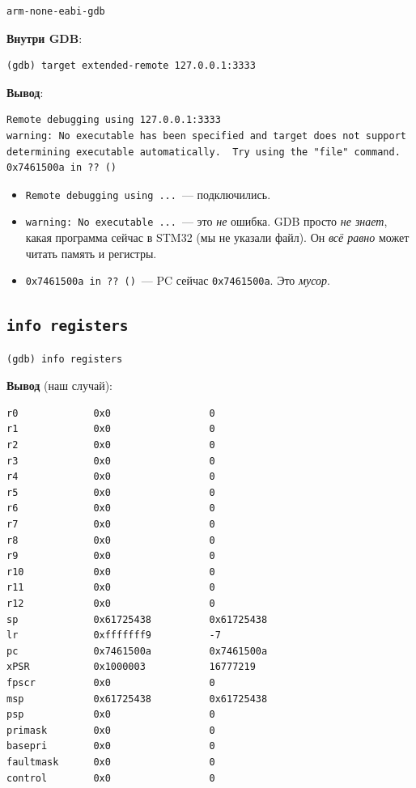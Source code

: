 \begin{verbatim}
arm-none-eabi-gdb
\end{verbatim}

\textbf{Внутри GDB}:

\begin{verbatim}
(gdb) target extended-remote 127.0.0.1:3333
\end{verbatim}

\textbf{Вывод}:

\begin{verbatim}
Remote debugging using 127.0.0.1:3333
warning: No executable has been specified and target does not support
determining executable automatically.  Try using the "file" command.
0x7461500a in ?? ()
\end{verbatim}

\begin{itemize}
    \item \texttt{Remote debugging using ...}~--- подключились.
    \item \texttt{warning: No executable ...}~--- это
          \emph{не} ошибка. GDB просто \emph{не знает},
          какая программа сейчас в STM32 (мы не указали
          файл). Он \emph{всё равно} может читать память
          и регистры.
    \item \texttt{0x7461500a in ?? ()}~--- PC сейчас
          \texttt{0x7461500a}. Это \emph{мусор}.
\end{itemize}

\subsection{\texttt{info registers}}

\begin{verbatim}
(gdb) info registers
\end{verbatim}

\textbf{Вывод} (наш случай):

\begin{verbatim}
r0             0x0                 0
r1             0x0                 0
r2             0x0                 0
r3             0x0                 0
r4             0x0                 0
r5             0x0                 0
r6             0x0                 0
r7             0x0                 0
r8             0x0                 0
r9             0x0                 0
r10            0x0                 0
r11            0x0                 0
r12            0x0                 0
sp             0x61725438          0x61725438
lr             0xfffffff9          -7
pc             0x7461500a          0x7461500a
xPSR           0x1000003           16777219
fpscr          0x0                 0
msp            0x61725438          0x61725438
psp            0x0                 0
primask        0x0                 0
basepri        0x0                 0
faultmask      0x0                 0
control        0x0                 0
\end{verbatim}

